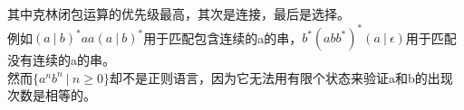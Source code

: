 \vspace{0.5cm}

其中克林闭包运算的优先级最高，其次是连接，最后是选择。\\

例如$ (a\ |\ b)^*aa(a\ |\ b)^* $用于匹配包含连续的a的串，$ b^*(abb^*)^*(a\ |\ \epsilon) $用于匹配没有连续的a的串。\\

然而$ \{a^nb^n\ |\ n \ge 0\} $却不是正则语言，因为它无法用有限个状态来验证a和b的出现次数是相等的。\\

\newpage
